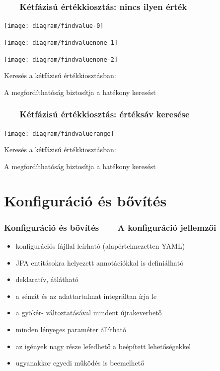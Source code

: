 \documentclass[
]{beamer}
\newcommand{\slidetitle}[2]{\frametitle{{\small #1 ~ \ding{226} ~ } \normalsize \textbf{#2} }}
\begin{document}
\begin{frame}
    \slidetitle{\sectionshorttitle}{Kétfázisú értékkiosztás: nincs ilyen érték}
    
    \centering
    
    \begin{overprint}
        \centerline{\texttt{[image: diagram/findvalue-0]}}
        \centerline{\texttt{[image: diagram/findvaluenone-1]}}
        \centerline{\texttt{[image: diagram/findvaluenone-2]}}
    \end{overprint}
    
    \vspace{0.5cm}
    
    Keresés a kétfázisú értékkiosztásban: \par
    A megfordíthatóság biztosítja a hatékony keresést
\end{frame}

\begin{frame}
    \slidetitle{\sectionshorttitle}{Kétfázisú értékkiosztás: értéksáv keresése}
    
    \centering
    
    \texttt{[image: diagram/findvaluerange]}
    
    \vspace{0.5cm}
    
    Keresés a kétfázisú értékkiosztásban: \par
    A megfordíthatóság biztosítja a hatékony keresést
\end{frame}

\section{Konfiguráció és bővítés}
\def\sectionshorttitle{Konfiguráció és bővítés}

\begin{frame}
    \slidetitle{\sectionshorttitle}{A konfiguráció jellemzői}
    
    \begin{itemize}
        \setlength\itemsep{0.5em}
        \pause \item konfigurációs fájllal leírható (alapértelmezetten YAML)
        \pause \item JPA entitásokra helyezett annotációkkal is definiálható
        \pause \item deklaratív, átlátható
        \pause \item a sémát és az adattartalmat integráltan írja le
        \pause \item a gyökér- változtatásával mindent újrakeverhető
        \pause \item minden lényeges paraméter állítható
        \pause \item az igények nagy része lefedhető a beépített lehetőségekkel
        \pause \item ugyanakkor egyedi működés is beemelhető
    \end{itemize}
\end{frame}
\end{document}
